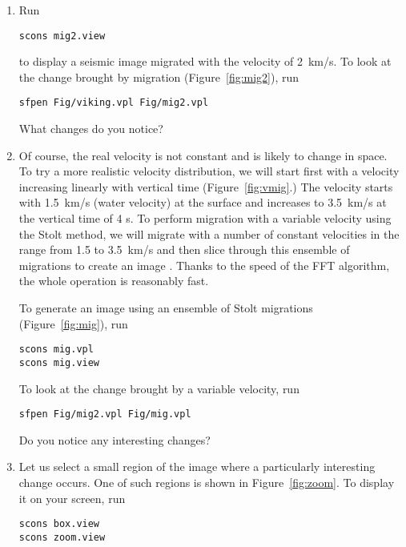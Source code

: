 \begin{enumerate}
\item Run
\begin{verbatim}
scons mig2.view
\end{verbatim}
to display a seismic image migrated with the velocity of 2~km/s. To look at the change brought by migration (Figure~\ref{fig:mig2}), run
\begin{verbatim}
sfpen Fig/viking.vpl Fig/mig2.vpl
\end{verbatim}
What changes do you notice?

\answer{%

}

\item Of course, the real velocity is not constant and is likely to change in space. To try a more realistic velocity distribution, we will start first with a velocity increasing linearly with vertical time (Figure~\ref{fig:vmig}.) The velocity starts with 1.5~km/s (water velocity) at the surface and increases to 3.5~km/s at the vertical time of 4 s. To perform migration with a variable velocity using the Stolt method, we will migrate with a number of constant velocities in the range from 1.5 to 3.5~km/s and then slice through this ensemble of migrations to create an image \cite[]{GEO57-01-00510059}. Thanks to the speed of the FFT algorithm, the whole operation is reasonably fast.


To generate an image using an ensemble of Stolt migrations (Figure~\ref{fig:mig}), run
\begin{verbatim}
scons mig.vpl
scons mig.view
\end{verbatim}
To look at the change brought by a variable velocity, run
\begin{verbatim}
sfpen Fig/mig2.vpl Fig/mig.vpl
\end{verbatim}
Do you notice any interesting changes?


\item Let us select a small region of the image where a particularly interesting change occurs. One of such regions is shown in Figure~\ref{fig:zoom}. To display it on your screen, run
\begin{verbatim}
scons box.view
scons zoom.view
\end{verbatim}


\end{enumerate}
